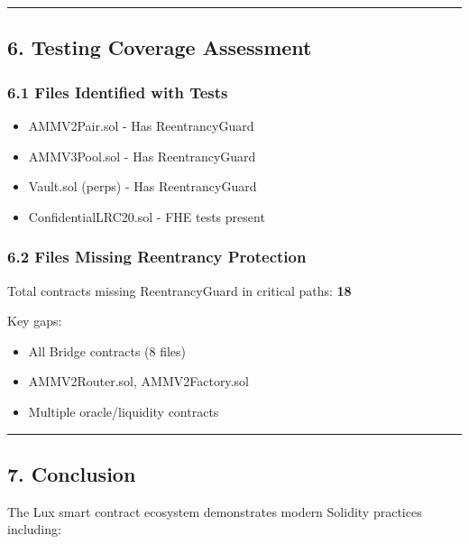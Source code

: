 \documentclass[
]{article}
\providecommand{\tightlist}{%
  \setlength{\itemsep}{0pt}\setlength{\parskip}{0pt}}
\begin{document}
\begin{center}\rule{0.5\linewidth}{0.5pt}\end{center}

\subsection{6. Testing Coverage
Assessment}\label{6-testing-coverage-assessment}

\subsubsection{6.1 Files Identified with
Tests}\label{61-files-identified-with-tests}

\begin{itemize}
\tightlist
\item
  AMMV2Pair.sol - Has ReentrancyGuard
\item
  AMMV3Pool.sol - Has ReentrancyGuard
\item
  Vault.sol (perps) - Has ReentrancyGuard
\item
  ConfidentialLRC20.sol - FHE tests present
\end{itemize}

\subsubsection{6.2 Files Missing Reentrancy
Protection}\label{62-files-missing-reentrancy-protection}

Total contracts missing ReentrancyGuard in critical paths: \textbf{18}

Key gaps:

\begin{itemize}
\tightlist
\item
  All Bridge contracts (8 files)
\item
  AMMV2Router.sol, AMMV2Factory.sol
\item
  Multiple oracle/liquidity contracts
\end{itemize}

\begin{center}\rule{0.5\linewidth}{0.5pt}\end{center}

\subsection{7. Conclusion}\label{7-conclusion}

The Lux smart contract ecosystem demonstrates modern Solidity practices
including:
\end{document}
